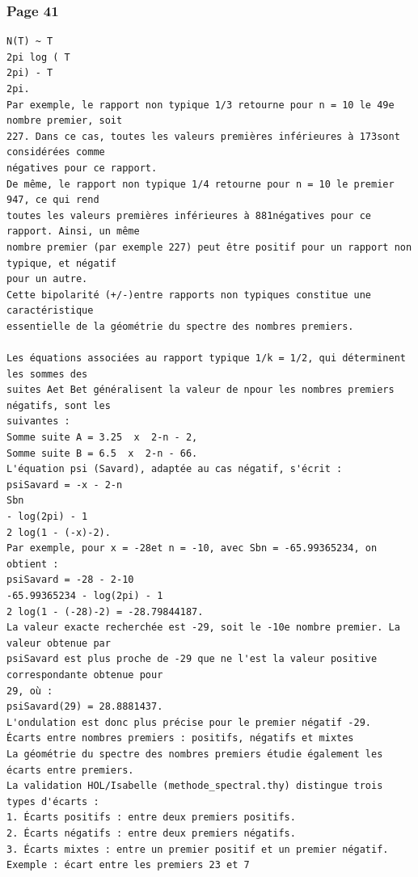 \documentclass[11pt,a4paper]{article}
\begin{document}
\subsubsection*{Page 41}
\begin{Verbatim}[fontsize=\footnotesize]
N(T) ~ T
2pi log ( T
2pi) - T
2pi. 
Par exemple, le rapport non typique 1/3 retourne pour n = 10 le 49e nombre premier, soit
227. Dans ce cas, toutes les valeurs premières inférieures à 173sont considérées comme 
négatives pour ce rapport. 
De même, le rapport non typique 1/4 retourne pour n = 10 le premier 947, ce qui rend
toutes les valeurs premières inférieures à 881négatives pour ce rapport. Ainsi, un même 
nombre premier (par exemple 227) peut être positif pour un rapport non typique, et négatif 
pour un autre. 
Cette bipolarité (+/-)entre rapports non typiques constitue une caractéristique 
essentielle de la géométrie du spectre des nombres premiers. 
 
Les équations associées au rapport typique 1/k = 1/2, qui déterminent les sommes des
suites Aet Bet généralisent la valeur de npour les nombres premiers négatifs, sont les 
suivantes : 
Somme suite A = 3.25  x  2-n - 2, 
Somme suite B = 6.5  x  2-n - 66. 
L'équation psi (Savard), adaptée au cas négatif, s'écrit : 
psiSavard = -x - 2-n
Sbn
- log(2pi) - 1
2 log(1 - (-x)-2). 
Par exemple, pour x = -28et n = -10, avec Sbn = -65.99365234, on obtient : 
psiSavard = -28 - 2-10
-65.99365234 - log(2pi) - 1
2 log(1 - (-28)-2) = -28.79844187. 
La valeur exacte recherchée est -29, soit le -10e nombre premier. La valeur obtenue par 
psiSavard est plus proche de -29 que ne l'est la valeur positive correspondante obtenue pour
29, où : 
psiSavard(29) = 28.8881437. 
L'ondulation est donc plus précise pour le premier négatif -29. 
Écarts entre nombres premiers : positifs, négatifs et mixtes 
La géométrie du spectre des nombres premiers étudie également les écarts entre premiers. 
La validation HOL/Isabelle (methode_spectral.thy) distingue trois types d'écarts : 
1. Écarts positifs : entre deux premiers positifs. 
2. Écarts négatifs : entre deux premiers négatifs. 
3. Écarts mixtes : entre un premier positif et un premier négatif. 
Exemple : écart entre les premiers 23 et 7 
\end{Verbatim}
\medskip
\end{document}
